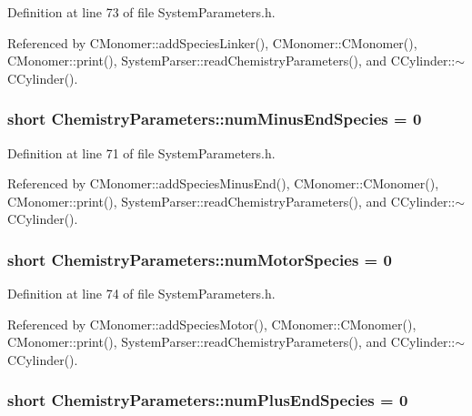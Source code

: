 Definition at line 73 of file System\+Parameters.\+h.



Referenced by C\+Monomer\+::add\+Species\+Linker(), C\+Monomer\+::\+C\+Monomer(), C\+Monomer\+::print(), System\+Parser\+::read\+Chemistry\+Parameters(), and C\+Cylinder\+::$\sim$\+C\+Cylinder().

\hypertarget{structChemistryParameters_a13d911b0639656b466b1ea13be22be00}{
\subsubsection[{num\+Minus\+End\+Species}]{\setlength{\rightskip}{0pt plus 5cm}short Chemistry\+Parameters\+::num\+Minus\+End\+Species = 0}}\label{structChemistryParameters_a13d911b0639656b466b1ea13be22be00}


Definition at line 71 of file System\+Parameters.\+h.



Referenced by C\+Monomer\+::add\+Species\+Minus\+End(), C\+Monomer\+::\+C\+Monomer(), C\+Monomer\+::print(), System\+Parser\+::read\+Chemistry\+Parameters(), and C\+Cylinder\+::$\sim$\+C\+Cylinder().

\hypertarget{structChemistryParameters_a6aecadee2f3bb6bc436395473447c485}{
\subsubsection[{num\+Motor\+Species}]{\setlength{\rightskip}{0pt plus 5cm}short Chemistry\+Parameters\+::num\+Motor\+Species = 0}}\label{structChemistryParameters_a6aecadee2f3bb6bc436395473447c485}


Definition at line 74 of file System\+Parameters.\+h.



Referenced by C\+Monomer\+::add\+Species\+Motor(), C\+Monomer\+::\+C\+Monomer(), C\+Monomer\+::print(), System\+Parser\+::read\+Chemistry\+Parameters(), and C\+Cylinder\+::$\sim$\+C\+Cylinder().

\hypertarget{structChemistryParameters_a14a3adb276b758bb6f2e5d0a27f80b15}{
\subsubsection[{num\+Plus\+End\+Species}]{\setlength{\rightskip}{0pt plus 5cm}short Chemistry\+Parameters\+::num\+Plus\+End\+Species = 0}}\label{structChemistryParameters_a14a3adb276b758bb6f2e5d0a27f80b15}


